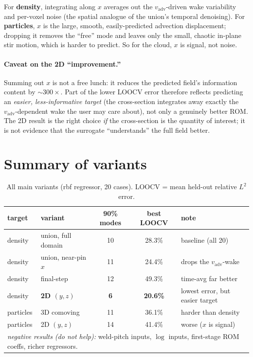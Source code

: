 \documentclass[11pt]{article}
\newcommand{\vadv}{v_{\mathrm{adv}}}
\begin{document}
For \textbf{density}, integrating along $x$ averages out the
$\vadv$-driven wake variability and per-voxel noise (the spatial analogue
of the union's temporal denoising). For \textbf{particles}, $x$ is the
large, smooth, easily-predicted advection displacement; dropping it
removes the ``free'' mode and leaves only the small, chaotic in-plane stir
motion, which is harder to predict. So for the cloud, $x$ is signal, not
noise.

\paragraph{Caveat on the 2D ``improvement.''} Summing out $x$ is not a
free lunch: it reduces the predicted field's information content by
${\sim}300\times$. Part of the lower LOOCV error therefore reflects
predicting an \emph{easier, less-informative target} (the cross-section
integrates away exactly the $\vadv$-dependent wake the user may care
about), not only a genuinely better ROM. The 2D result is the right choice
\emph{if} the cross-section is the quantity of interest; it is not evidence
that the surrogate ``understands'' the full field better.

\section{Summary of variants}
\begin{table}[H]\centering\small
\begin{tabular}{llccl}
\toprule
target & variant & 90\% modes & best LOOCV & note \\
\midrule
density & union, full domain & 10 & 28.3\% & baseline (all 20) \\
density & union, near-pin $x$ & 11 & 24.4\% & drops the $\vadv$-wake \\
density & final-step & 12 & 49.3\% & time-avg far better \\
density & \textbf{2D $(y,z)$} & \textbf{6} & \textbf{20.6\%} & lowest error, but easier target \\
particles & 3D comoving & 11 & 36.1\% & harder than density \\
particles & 2D $(y,z)$ & 14 & 41.4\% & worse ($x$ is signal) \\
\midrule
\multicolumn{5}{l}{\emph{negative results (do not help):} weld-pitch inputs,
$\log$ inputs, first-stage ROM coeffs, richer regressors.}\\
\bottomrule
\end{tabular}
\caption{All main variants (rbf regressor, 20 cases). LOOCV = mean
held-out relative $L^2$ error.}
\end{table}
\end{document}
